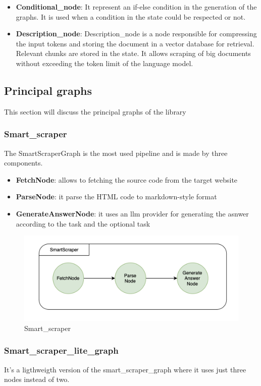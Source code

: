\begin{itemize}
    \item \textbf{Conditional\_node}: It represent an if-else condition in the generation of the graphs. It is used when a condition in the state could be respected or not.

    \item \textbf{Description\_node}: Description\_node is a node responsible for compressing the input tokens and storing the document in a vector database for retrieval. Relevant chunks are stored in the state. It allows scraping of big documents without exceeding the token limit of the language model.

\end{itemize}

\subsection{Principal graphs}

This section will discuss the principal graphs of the library
\subsubsection{Smart\_scraper}
The SmartScraperGraph is the most used pipeline and is made by three components.
\begin{itemize}
    \item \textbf{FetchNode}: allows to fetching the source code from the target website
    \item \textbf{ParseNode}: it parse the HTML code to markdown-style format
    \item \textbf{GenerateAnswerNode}: it uses an llm provider for generating the asnwer according to the task and the optional task
\end{itemize}
\begin{figure}[h!]
    \centering
    \includegraphics[width=0.75\linewidth]{Assets/smart_scraper.png}
    \caption{Smart\_scraper}
    \label{fig:smart_scraper}
\end{figure}

\subsubsection{Smart\_scraper\_lite\_graph}
It's a ligthweigth version of the smart\_scraper\_graph where it uses just three nodes instead of two.

